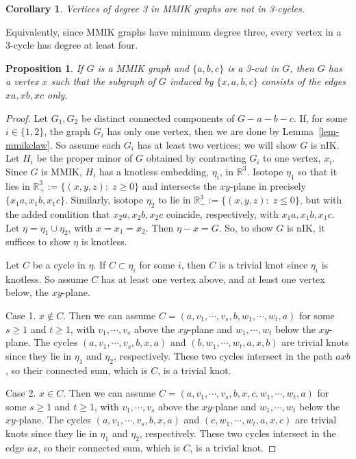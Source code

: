 \documentclass{amsart}
\newtheorem{proposition}[theorem]{Proposition}
\newtheorem{corollary}[theorem]{Corollary}
\theoremstyle{remark}
\newcommand{\R}{\mathbb R}
\newcommand{\st}{: \;}
\begin{document}
{\begin{corollary}
\label{cor-mmikclaw}
Vertices of degree 3 in MMIK graphs
are not in 3-cycles.
\end{corollary}

Equivalently, since MMIK graphs have minimum degree three, every vertex in a 3-cycle has degree at least four.

\begin{proposition}
\label{prop-mmik3cut}
If $G$ is a MMIK graph and $\{a, b, c\}$ is a 3-cut in $G$,
then $G$ has a vertex $x$ such that
the subgraph of $G$ induced by $\{x,a,b,c\}$ consists of
the edges $xa, xb, xc$ only.
\end{proposition}

\begin{proof}
Let $G_1, G_2$ be distinct connected components of $G -a-b-c$.
If, for some $i \in \{1,2\}$, the graph $G_i$ has only one vertex,
then we are done  by Lemma~\ref{lem-mmikclaw}.
So assume each $G_i$ has at least two vertices; we will show $G$ is nIK.
Let $H_i$ be the proper minor of $G$ obtained by contracting $G_i$ to one vertex, $x_i$.
Since $G$ is MMIK, $H_i$ has a knotless embedding, $\eta_i$, in $\R^3$.
Isotope $\eta_1$ so that it lies in $\R^3_+ := \{(x,y,z) \st z \ge 0\}$
and intersects the $xy$-plane in precisely $\{x_1a, x_1b, x_1c\}$.
Similarly, isotope $\eta_2$ to lie in $\R^3_- := \{(x,y,z) \st z \le 0\}$,
but with the added condition that $x_2 a, x_2 b, x_2 c$ coincide, respectively, 
with   $x_1 a, x_1 b, x_1 c$.
Let $\eta = \eta_1 \cup \eta_2$,
with $x = x_1 = x_2$.
Then $\eta - x =G$.
So, to show $G$ is nIK, it suffices to show $\eta$ is knotless.

Let $C$ be a cycle in $\eta$.
If $C \subset \eta_i$ for some $i$,
then $C$ is a trivial knot since $\eta_i$ is knotless.
So assume $C$ has 
at least one vertex above, and at least one vertex below, the $xy$-plane.

Case 1. 
$x \not \in C$.
Then we can assume 
$C= (a, v_1, \cdots, v_s, b, w_1, \cdots, w_t, a)$
for some $s \ge 1$ and $t \ge 1$, 
with $v_1, \cdots, v_s$ above the $xy$-plane
and $w_1, \cdots, w_t$ below the $xy$-plane.
The cycles 
$(a, v_1, \cdots, v_s, b, x, a)$ and
$(b, w_1, \cdots, w_t, a, x, b)$
are trivial knots since they lie in $\eta_1$ and $\eta_2$, respectively.
These two cycles intersect in the path $axb$,
so their connected sum, which is $C$, is a trivial knot.

Case 2. 
$x \in C$.
Then we can assume 
$C= (a, v_1, \cdots, v_s, b, x, c, w_1, \cdots, w_t, a)$
for some $s \ge 1$ and $t \ge 1$, 
with $v_1, \cdots, v_s$ above the $xy$-plane
and $w_1, \cdots, w_t$ below the $xy$-plane.
The cycles 
$(a, v_1, \cdots, v_s, b, x, a)$ and
$(c, w_1, \cdots, w_t, a, x, c)$
are trivial knots since they lie in $\eta_1$ and $\eta_2$, respectively.
These two cycles intersect in the edge $ax$,
so their connected sum, which is $C$, is a trivial knot.
\end{proof}

}
\end{document}
